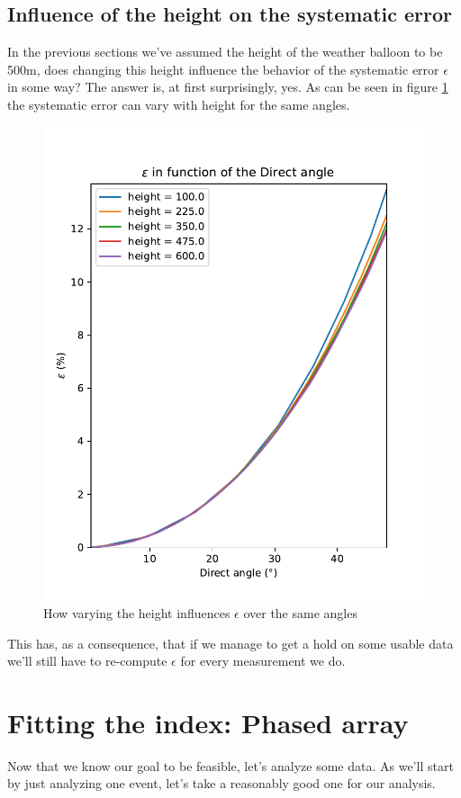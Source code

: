 \subsection{Influence of the height on the systematic error}
In the previous sections we've assumed the height of the weather balloon to be
500m, does changing this height influence the behavior of the systematic error $\epsilon$ in some
way?  The answer is, at first surprisingly, yes. As can be seen in figure
\ref{fig:EpsWithHeight} the systematic error can vary with height for the same angles.
\begin{figure}
	\centering
	\includegraphics[height=0.4\textheight]{figures/EpsilonWithHeight.pdf}
	\caption{How varying the height influences $\epsilon$ over the same angles}
	\label{fig:EpsWithHeight}
\end{figure}
This has, as a consequence, that if we manage to get a hold on some
usable data we'll still have to re-compute $\epsilon$ for 
every measurement we do.
\section{Fitting the index: Phased array}
Now that we know our goal to be feasible, let's analyze some data.  As we'll
start by just analyzing one event, let's take a reasonably good one for our analysis.

